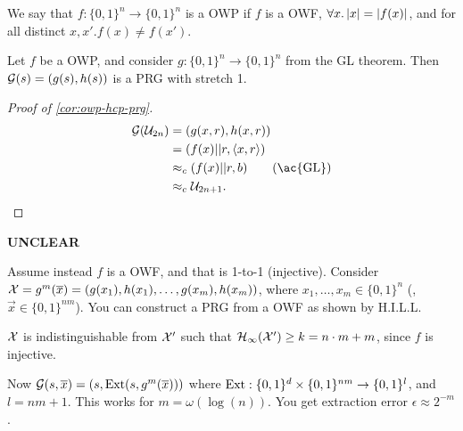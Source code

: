 \begin{definition}
	We say that $f : \{0,1\}^n \to \{0,1\}^{n}$ is a \ac{OWP} if $f$ is a \ac{OWF}, $\forall x . \left|{x}\right| = \left|{f(x)}\right|$, and for all distinct $x, x' . f(x) \neq f(x')$.
\end{definition}

\begin{corollary} \label{cor:owp-hcp-prg}
	Let $f$ be a \ac{OWP}, and consider $g : \{0,1\}^n \to \{0,1\}^{n}$ from the \ac{GL} theorem.
	Then $\mathcal{G}(s) = (g(s), h(s))$ is a \ac{PRG} with stretch 1.
\end{corollary}

\begin{proof}[Proof of \cref{cor:owp-hcp-prg}]
	\begin{align*}
		\G(\U_{2n})
		& =
		(g(x,r), h(x,r)) \\
		& =
		(f(x) || r, \DotProduct{x}{r}) \\
		& \CompInd 
		(f(x) || r, b) \tag{\ac{GL}}
		\\
		& \CompInd
		\U_{2n+1}.
	\end{align*}
\end{proof}


\begin{framed}
{\bfseries UNCLEAR}

Assume instead $f$ is a \ac{OWF}, and that is 1-to-1 (injective).
Consider $\mathcal{X} = g^m(\overline{x}) = (g(x_1), h(x_1), \dots, g(x_m), h(x_m))$, where $x_1, \dots, x_m \in \{0,1\}^{n}$ (\ie, $\vec{x} \in \{0,1\}^{nm}$).
You can construct a \ac{PRG} from a \ac{OWF} as shown by H.I.L.L.

\begin{fact}
$\mathcal{X}$ is indistinguishable from $\mathcal{X}'$ such that $\mathcal{H}_{\infty}(\mathcal{X}') \ge k = n \cdot m + m$, since $f$ is injective.
\end{fact}

Now $\mathcal{G}(s, \overline{x}) = (s, \mathrm{Ext}(s, g^{m}(\overline{x})))$ where $\mathrm{Ext} : \{0,1\}^{d} \times \{0,1\}^{nm} \to \{0,1\}^{l}$, and $l = nm + 1$.
This works for $m = \omega(\log(n))$.
You get extraction error $\epsilon \approx 2^{-m}$.
\end{framed}

